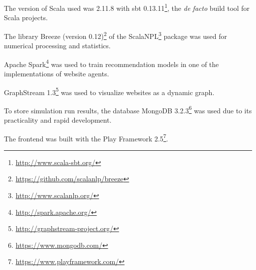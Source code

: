 The version of Scala used was 2.11.8 with sbt 
0.13.11\footnote{\url{http://www.scala-sbt.org/}}, the \textit{de facto} build 
tool for Scala projects.

The library Breeze (version 
0.12)\footnote{\url{https://github.com/scalanlp/breeze}} of the 
ScalaNPL\footnote{\url{http://www.scalanlp.org/}} package was used 
for numerical processing and statistics.

Apache Spark\footnote{\url{http://spark.apache.org/}} was used 
to train recommendation models in one of the implementations of website agents. 

GraphStream 1.3\footnote{\url{http://graphstream-project.org/}} was used to 
visualize websites as a dynamic graph.

To store simulation run results, the database MongoDB 
3.2.3\footnote{\url{https://www.mongodb.com/}} was used due to its practicality 
and rapid development.

The frontend was built with the Play Framework 
2.5\footnote{\url{https://www.playframework.com/}}.
